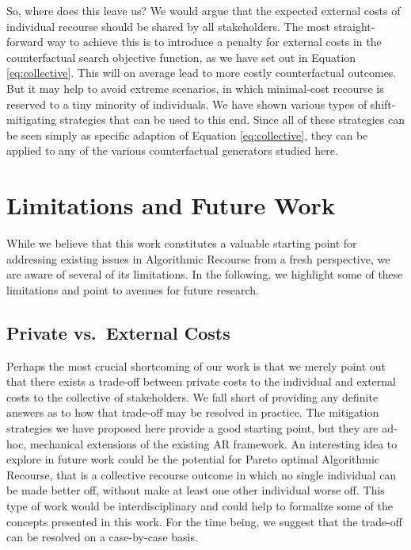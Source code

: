 \documentclass[conference,final,]{IEEEtran}
\begin{document}
So, where does this leave us? We would argue that the expected external costs of individual recourse should be shared by all stakeholders. The most straight-forward way to achieve this is to introduce a penalty for external costs in the counterfactual search objective function, as we have set out in Equation \eqref{eq:collective}. This will on average lead to more costly counterfactual outcomes. But it may help to avoid extreme scenarios, in which minimal-cost recourse is reserved to a tiny minority of individuals. We have shown various types of shift-mitigating strategies that can be used to this end. Since all of these strategies can be seen simply as specific adaption of Equation \eqref{eq:collective}, they can be applied to any of the various counterfactual generators studied here.

\hypertarget{limit}{%
\section{Limitations and Future Work}\label{limit}}

While we believe that this work constitutes a valuable starting point for addressing existing issues in Algorithmic Recourse from a fresh perspective, we are aware of several of its limitations. In the following, we highlight some of these limitations and point to avenues for future research.

\hypertarget{private-vs.-external-costs}{%
\subsection{Private vs.~External Costs}\label{private-vs.-external-costs}}

Perhaps the most crucial shortcoming of our work is that we merely point out that there exists a trade-off between private costs to the individual and external costs to the collective of stakeholders. We fall short of providing any definite answers as to how that trade-off may be resolved in practice. The mitigation strategies we have proposed here provide a good starting point, but they are ad-hoc, mechanical extensions of the existing AR framework. An interesting idea to explore in future work could be the potential for Pareto optimal Algorithmic Recourse, that is a collective recourse outcome in which no single individual can be made better off, without make at least one other individual worse off. This type of work would be interdisciplinary and could help to formalize some of the concepts presented in this work. For the time being, we suggest that the trade-off can be resolved on a case-by-case basis.
\end{document}
